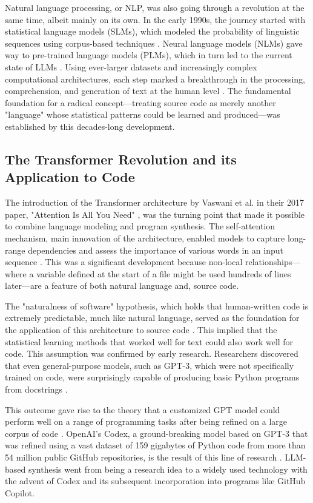 \documentclass[12pt, a4paper]{report}
\begin{document}
Natural language processing, or NLP, was also going through a revolution at the same time, albeit mainly on its own. In the early 1990s, the journey started with statistical language models (SLMs), which modeled the probability of linguistic sequences using corpus-based techniques \citep{jurafsky2023speech}. Neural language models (NLMs) gave way to pre-trained language models (PLMs), which in turn led to the current state of LLMs \citep{jurafsky2023speech}. Using ever-larger datasets and increasingly complex computational architectures, each step marked a breakthrough in the processing, comprehension, and generation of text at the human level \citep{zhao2023survey}. The fundamental foundation for a radical concept—treating source code as merely another "language" whose statistical patterns could be learned and produced—was established by this decades-long development.

\subsection{The Transformer Revolution and its Application to Code}

The introduction of the Transformer architecture by Vaswani et al. in their 2017 paper, "Attention Is All You Need" \citep{vaswani2017attention}, was the turning point that made it possible to combine language modeling and program synthesis. The self-attention mechanism, main innovation of the architecture, enabled models to capture long-range dependencies and assess the importance of various words in an input sequence \citep{vaswani2017attention}. This was a significant development because non-local relationships—where a variable defined at the start of a file might be used hundreds of lines later—are a feature of both natural language and, source code.

The "naturalness of software" hypothesis, which holds that human-written code is extremely predictable, much like natural language, served as the foundation for the application of this architecture to source code \citep{hindle2012naturalness}. This implied that the statistical learning methods that worked well for text could also work well for code. This assumption was confirmed by early research. Researchers discovered that even general-purpose models, such as GPT-3, which were not specifically trained on code, were surprisingly capable of producing basic Python programs from docstrings \citep{chen2021evaluating}.

This outcome gave rise to the theory that a customized GPT model could perform well on a range of programming tasks after being refined on a large corpus of code \citep{chen2021evaluating}. OpenAI's Codex, a ground-breaking model based on GPT-3 that was refined using a vast dataset of 159 gigabytes of Python code from more than 54 million public GitHub repositories, is the result of this line of research \citep{chen2021evaluating}. LLM-based synthesis went from being a research idea to a widely used technology with the advent of Codex and its subsequent incorporation into programs like GitHub Copilot.
\end{document}
